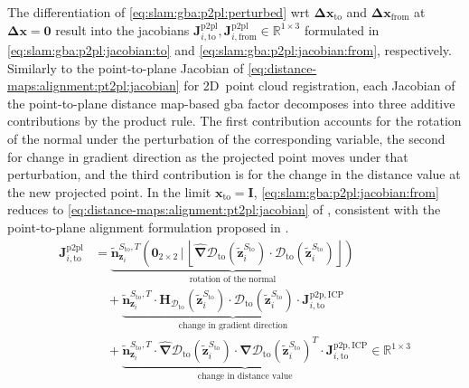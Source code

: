 The differentiation of \eqref{eq:slam:gba:p2pl:perturbed} \gls{wrt}
$\mathbf{\Delta x}_{\mathrm{to}}$ and $\mathbf{\Delta x}_{\mathrm{from}}$ at
$\mathbf{\Delta x}=\mathbf{0}$ result into the jacobians
$\mathbf{J}_{i,\mathrm{to}}^{\mathrm{p2pl}},
\mathbf{J}_{i,\mathrm{from}}^{\mathrm{p2pl}} \in \mathbb{R}^{1\times 3}$
formulated in \eqref{eq:slam:gba:p2pl:jacobian:to} and
\eqref{eq:slam:gba:p2pl:jacobian:from}, respectively.
Similarly to the point-to-plane Jacobian of
\eqref{eq:distance-maps:alignment:pt2pl:jacobian} for 2D~point cloud
registration, each Jacobian of the point-to-plane distance map-based \gls{gba}
factor decomposes into three additive contributions by the product rule.
The first contribution accounts for the rotation of the normal under
the perturbation of the corresponding variable, the second for change in
gradient direction as the projected point moves under that perturbation, and
the third contribution is for the change in the distance value at
the new projected point. In the limit
$\mathbf{x}_{\mathrm{to}} = \mathbf{I}$,
\eqref{eq:slam:gba:p2pl:jacobian:from} reduces to
\eqref{eq:distance-maps:alignment:pt2pl:jacobian} of
, consistent with the
point-to-plane alignment formulation proposed in
.
\begin{equation}
\begin{aligned}
\label{eq:slam:gba:p2pl:jacobian:to}
\mathbf{J}_{i,\mathrm{to}}^{\mathrm{p2pl}} & =
\underbrace{
  \tilde{\mathbf{n}}_{\mathbf{z}_i}^{S_{\mathrm{to}},T}
  \left(\mathbf{0}_{2\times 2}\,\Big|\,
    \left\lfloor  \hat{\bm{\nabla}}\mathcal{D}_{\mathrm{to}}\!\left(\tilde{\mathbf{z}}_i^{S_{\mathrm{to}}}\right) \cdot
                  \mathcal{D}_{\mathrm{to}}\!\left(\tilde{\mathbf{z}}_i^{S_{\mathrm{to}}}\right)
    \right\rfloor
  \right)
}_{\text{rotation of the normal}}
\\
&\quad+
\underbrace{
  \tilde{\mathbf{n}}_{\mathbf{z}_i}^{S_{\mathrm{to}},T} \cdot
  \mathbf{H}_{\mathcal{D}_{\mathrm{to}}}\!\left(\tilde{\mathbf{z}}_i^{S_{\mathrm{to}}}\right) \cdot
  \mathcal{D}_{\mathrm{to}}\!\left(\tilde{\mathbf{z}}_i^{S_{\mathrm{to}}}\right) \cdot
  \mathbf{J}_{i,\mathrm{to}}^{\mathrm{p2p,ICP}}
}_{\text{change in gradient direction}}
\\
&\quad+
\underbrace{
  \tilde{\mathbf{n}}_{\mathbf{z}_i}^{S_{\mathrm{to}},T} \cdot
  \hat{\bm{\nabla}}\mathcal{D}_{\mathrm{to}}\!\left(\tilde{\mathbf{z}}_i^{S_{\mathrm{to}}}\right) \cdot
  \bm{\nabla}\mathcal{D}_{\mathrm{to}}\!\left(\tilde{\mathbf{z}}_i^{S_{\mathrm{to}}}\right)^T \cdot
  \mathbf{J}_{i,\mathrm{to}}^{\mathrm{p2p,ICP}}
}_{\text{change in distance value}}
\in\mathbb{R}^{1\times3}
\end{aligned}
\end{equation}
